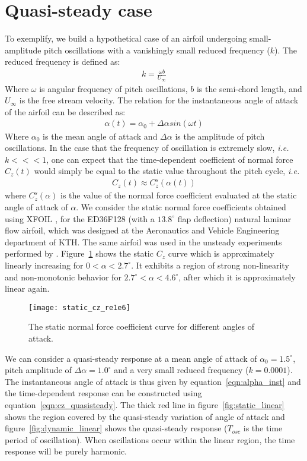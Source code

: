 \section{Quasi-steady case}
To exemplify, we build a hypothetical case of an airfoil undergoing small-amplitude pitch oscillations with a vanishingly small reduced frequency ($k$). The reduced frequency is defined as:
\begin{align}
 k = \frac{\omega b}{U_{\infty}}
\end{align}
Where $\omega$ is angular frequency of pitch oscillations, $b$ is the semi-chord length, and $U_{\infty}$ is the free stream velocity. The relation for the instantaneous angle of attack of the airfoil can be described as:
\begin{align}
\alpha(t) = \alpha_{0} + \Delta\alpha sin(\omega t)
\label{eqn:alpha_inst}
\end{align}
Where $\alpha_{0}$ is the mean angle of attack and $\Delta\alpha$ is the amplitude of pitch oscillations. In the case that the frequency of oscillation is extremely slow, \textit{i.e.} $k<<<1$, one can expect that the time-dependent coefficient of normal force $C_{z}(t)$ would simply be equal to the static value throughout the pitch cycle, \textit{i.e.}
\begin{align}
C_{z}(t) \approx C^{s}_{z}(\alpha(t))
\label{eqn:cz_quasisteady}
\end{align}
where $C^{s}_{z}(\alpha)$ is the value of the normal force coefficient evaluated at the static angle of attack of $\alpha$. We consider the static normal force coefficients obtained using XFOIL \citep{drela89}, for the ED36F128 (with a $13.8^{\circ}$ flap deflection) natural laminar flow airfoil, which was designed at the Aeronautics and Vehicle Engineering department of KTH. The same airfoil was used in the unsteady experiments performed by \cite{lokattthesis}. Figure~\ref{fig:cz_static} shows the static $C_{z}$ curve which is approximately linearly increasing for $0<\alpha<2.7^{\circ}$. It exhibits a region of strong non-linearity and non-monotonic behavior for $2.7^{\circ}<\alpha<4.6^{\circ}$, after which it is approximately linear again.
\begin{figure}[h]
	\centering
	\texttt{[image: static\_cz\_re1e6]}
	\caption{The static normal force coefficient curve for different angles of attack.}
	\label{fig:cz_static}
\end{figure}
We can consider a quasi-steady response at a mean angle of attack of $\alpha_{0}=1.5^{\circ}$, pitch amplitude of $\Delta\alpha=1.0^{\circ}$ and a very small reduced frequency ($k=0.0001$). The instantaneous angle of attack is thus given by equation~\ref{eqn:alpha_inst} and the time-dependent response can be constructed using equation~\ref{eqn:cz_quasisteady}. The thick red line in figure~\ref{fig:static_linear} shows the region covered by the quasi-steady variation of angle of attack and figure~\ref{fig:dynamic_linear} shows the quasi-steady response ($T_{osc}$ is the time period of oscillation). When oscillations occur within the linear region, the time response will be purely harmonic.
